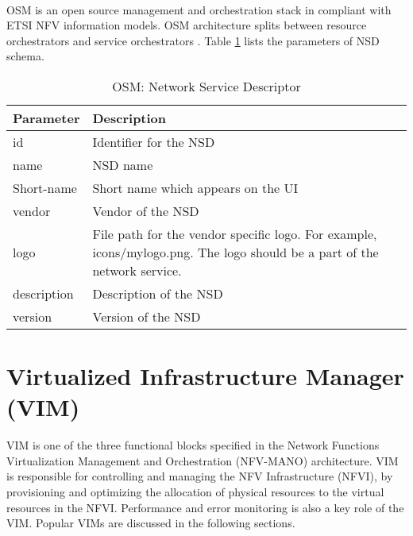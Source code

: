 \paragraph{}
OSM is an open source management and orchestration stack in compliant with ETSI NFV information models. OSM architecture splits between resource orchestrators and service orchestrators \cite{de2018network}. Table \ref{tab:OSM_nsd} lists the parameters of NSD schema. \cite{OSMSchemaDocumentation}
    \begin{table}[h]
        \centering
    \begin{tabular}{ |p{4cm}|p{10cm}|}
        \hline
        \textbf{Parameter} & \textbf{Description} \\
        \hline
         
         id &   Identifier for the NSD \\
         \hline
         name & NSD name \\
         \hline
         Short-name &   Short name which appears on the UI \\
         \hline
         vendor &   Vendor of the NSD \\
         \hline
         logo & File path for the vendor specific logo. For example, icons/mylogo.png. The logo should be a part of the network service. \\
         \hline
         description &  Description of the NSD \\
         \hline
         version &  Version of the NSD \\
         \hline
    \end{tabular}
        \caption{OSM: Network Service Descriptor}
    \label{tab:OSM_nsd}
 \end{table}


\newpage
\section{Virtualized Infrastructure Manager (VIM)}
VIM is one of the three functional blocks specified in the Network Functions Virtualization Management and Orchestration (NFV-MANO) architecture. VIM is responsible for controlling and managing the NFV Infrastructure (NFVI), by provisioning and optimizing the allocation of physical resources to the virtual resources in the NFVI. Performance and error monitoring is also a key role of the VIM. Popular VIMs are discussed in the following sections.
